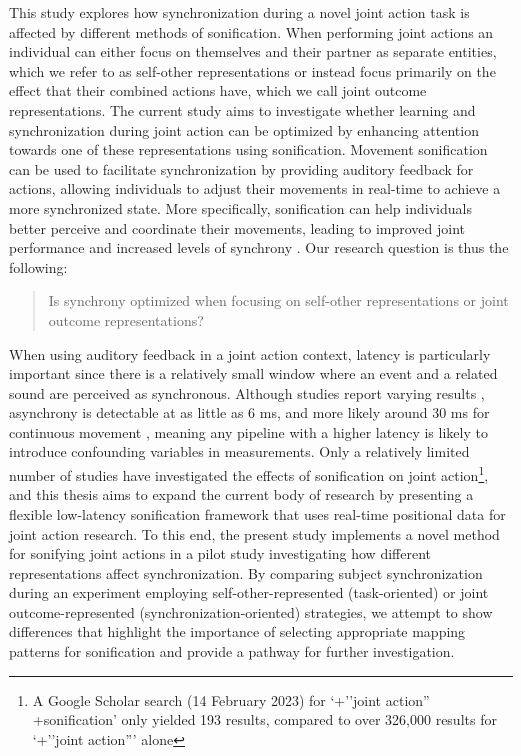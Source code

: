 \documentclass[10pt,a4paper,onecolumn]{article}
\begin{document}
This study explores how synchronization during a novel joint action task is affected by different methods of sonification. When performing joint actions an individual can either focus on themselves and their partner as separate entities, which we refer to as self-other representations or instead focus primarily on the effect that their combined actions have, which we call joint outcome representations. The current study aims to investigate whether learning and synchronization during joint action can be optimized by enhancing attention towards one of these representations using sonification. Movement sonification can be used to facilitate synchronization by providing auditory feedback for actions, allowing individuals to adjust their movements in real-time to achieve a more synchronized state. More specifically, sonification can help individuals better perceive and coordinate their movements, leading to improved joint performance and increased levels of synchrony \autocite{dotovEntrainingChaoticDynamics2018}. Our research question is thus the following:

\begin{quote}
Is synchrony optimized when focusing on self-other representations or joint outcome representations?
\end{quote}

When using auditory feedback in a joint action context, latency is particularly important since there is a relatively small window where an event and a related sound are perceived as synchronous. Although studies report varying results \autocite{keetels2012perception}, asynchrony is detectable at as little as 6 ms, and more likely around 30 ms for continuous movement \autocite{mcphersonActionSoundLatencyAre2016}, meaning any pipeline with a higher latency is likely to introduce confounding variables in measurements. Only a relatively limited number of studies have investigated the effects of sonification on joint action\footnote{A Google Scholar search (14 February 2023) for `+''joint action'' +sonification' only yielded 193 results, compared to over 326,000 results for `+''joint action''' alone}, and this thesis aims to expand the current body of research by presenting a flexible low-latency sonification framework that uses real-time positional data for joint action research. To this end, the present study implements a novel method for sonifying joint actions in a pilot study investigating how different representations affect synchronization. By comparing subject synchronization during an experiment employing self-other-represented (task-oriented) or joint outcome-represented (synchronization-oriented) strategies, we attempt to show differences that highlight the importance of selecting appropriate mapping patterns for sonification and provide a pathway for further investigation.
\end{document}
